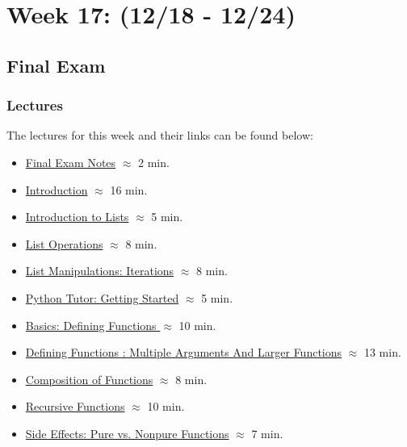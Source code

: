 \clearpage
\chapter{Week 17: (12/18 - 12/24)}

\section{Final Exam}

\subsection{Lectures}

The lectures for this week and their links can be found below:

\begin{itemize}
    \item \href{https://applied.cs.colorado.edu/mod/resource/view.php?id=51884}{Final Exam Notes} $\approx$ 2 min.
    \item \href{https://applied.cs.colorado.edu/mod/hvp/view.php?id=51907}{Introduction} $\approx$ 16 min.
    \item \href{https://applied.cs.colorado.edu/mod/hvp/view.php?id=51908}{Introduction to Lists} $\approx$ 5 min.
    \item \href{https://applied.cs.colorado.edu/mod/hvp/view.php?id=51909}{List Operations} $\approx$ 8 min.
    \item \href{https://applied.cs.colorado.edu/mod/hvp/view.php?id=51910}{List Manipulations: Iterations} $\approx$ 8 min.
    \item \href{https://applied.cs.colorado.edu/mod/hvp/view.php?id=51911}{Python Tutor: Getting Started} $\approx$ 5 min.
    \item \href{https://applied.cs.colorado.edu/mod/hvp/view.php?id=51912}{Basics: Defining Functions } $\approx$ 10 min.
    \item \href{https://applied.cs.colorado.edu/mod/hvp/view.php?id=51913}{Defining Functions : Multiple Arguments And Larger Functions} $\approx$ 13 min.
    \item \href{https://applied.cs.colorado.edu/mod/hvp/view.php?id=51914}{Composition of Functions} $\approx$ 8 min.
    \item \href{https://applied.cs.colorado.edu/mod/hvp/view.php?id=51915}{Recursive Functions} $\approx$ 10 min.
    \item \href{https://applied.cs.colorado.edu/mod/hvp/view.php?id=51916}{Side Effects: Pure vs. Nonpure Functions} $\approx$ 7 min.

\end{itemize}
